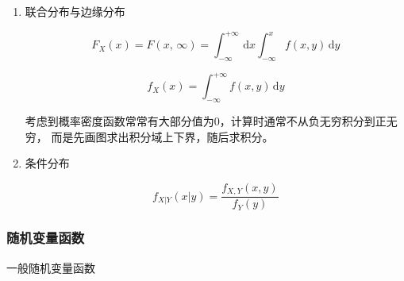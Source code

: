 \documentclass[UTF8,fontset=fandol,zihao=5]{ctexart}
\newcommand{\dd}{\,\mathrm{d}}
\begin{document}
\begin{enumerate}
  \begin{methodbox}[独立性判定]
    \begin{enumerate}
      \item 一般判定
    
      \[
      F(x, y) = F_X(x)F_Y(y)
      \]

      \item 离散型随机变量

      \[
      \forall x_i,y_j,\quad P(X=x_i,Y=y_j)=P(X=x_i)P(Y=y_j)
      \]

      \item 连续型随机变量
      
      \[
      f(x, y) = f_x(x)
      \]
    \end{enumerate}
  \end{methodbox}

  \item 联合分布与边缘分布
  
  \[
  F_X(x) = F(x,\, \infty) = \int_{-\infty}^{+\infty} \dd x \int_{-\infty}^{x} f(x, y) \dd y
  \]

  \[
  f_X(x) = \int_{-\infty}^{+\infty} f(x,y)\dd y
  \]

  考虑到概率密度函数常常有大部分值为0，计算时通常不从负无穷积分到正无穷，
  而是先画图求出积分域上下界，随后求积分。

  \item 条件分布

  \[
  f_{X|Y}(x|y) = \frac{f_{X,Y}(x,y)}{f_Y(y)}
  \]
\end{enumerate}

\subsubsection{随机变量函数}
  一般随机变量函数
\end{document}
